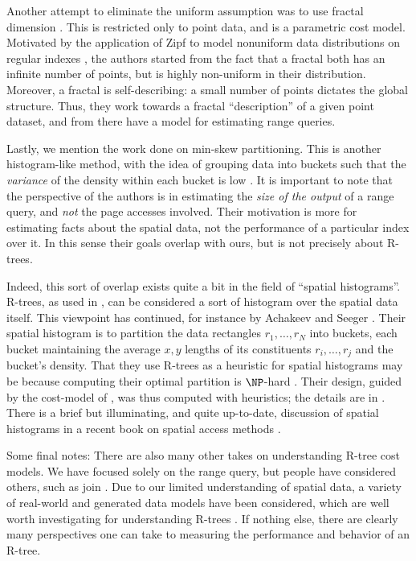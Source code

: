 Another attempt to eliminate the uniform assumption was to use fractal dimension \cite{faloutsoskamel94}. This is restricted only to point data, and is a parametric cost model.
Motivated by the application of Zipf to model nonuniform data distributions on regular indexes \cite{ioannidischristodoulakis91}, the authors started from the fact that a fractal both has an infinite number of points, but is highly non-uniform in their distribution.
Moreover, a fractal is self-describing: a small number of points dictates the global structure.
Thus, they work towards a fractal ``description'' of a given point dataset, and from there have a model for estimating range queries.

Lastly, we mention the work done on min-skew partitioning.
This is another histogram-like method, with the idea of grouping data into buckets such that the \emph{variance} of the density within each bucket is low \cite{acharyapoosalaramaswamy99}.
It is important to note that the perspective of the authors is in estimating the \emph{size of the output} of a range query, and \emph{not} the page accesses involved.
Their motivation is more for estimating facts about the spatial data, not the performance of a particular index over it.
In this sense their goals overlap with ours, but is not precisely about R-trees.

Indeed, this sort of overlap exists quite a bit in the field of ``spatial histograms''.
R-trees, as used in \cite{acharyapoosalaramaswamy99}, can be considered a sort of histogram over the spatial data itself.
This viewpoint has continued, for instance by Achakeev and Seeger \cite{achakeevseeger12}.
Their spatial histogram is to partition the data rectangles $r_1,\ldots,r_N$ into buckets, each bucket maintaining the average $x,y$ lengths of its constituents $r_i,\ldots,r_j$ and the bucket's density.
That they use R-trees as a heuristic for spatial histograms may be because computing their optimal partition is $\NP$-hard \cite{muthukrishnanpoosalasuel99}.
Their design, guided by the cost-model of \cite{theodoridissellis96}, was thus computed with heuristics; the details are in \cite{achakeevseeger12a}.
There is a brief but illuminating, and quite up-to-date, discussion of spatial histograms in a recent book on spatial access methods \cite{mamoulis11}.

Some final notes:
There are also many other takes on understanding R-tree cost models.
We have focused solely on the range query, but people have considered others, such as join \cite{thebook,aboulnaganaughton00}.
Due to our limited understanding of spatial data, a variety of real-world and generated data models have been considered, which are well worth investigating for understanding R-trees \cite{aboulnaganaughton00, anyangsivasubramaniam01, achakeevseeger12,achakeevseeger12a}.
If nothing else, there are clearly many perspectives one can take to measuring the performance and behavior of an R-tree.

